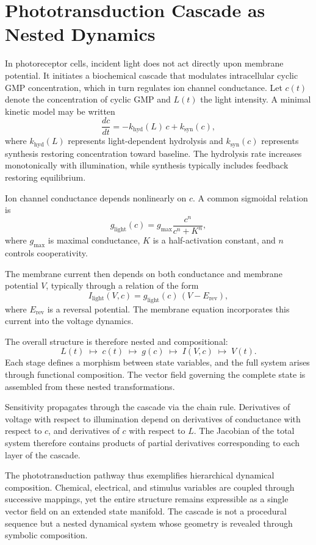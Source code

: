 \documentclass[12pt]{book}
\begin{document}
\section{Phototransduction Cascade as Nested Dynamics}

In photoreceptor cells, incident light does not act directly upon
membrane potential. It initiates a biochemical cascade that modulates
intracellular cyclic GMP concentration, which in turn regulates ion
channel conductance. Let $c(t)$ denote the concentration of cyclic GMP
and $L(t)$ the light intensity. A minimal kinetic model may be written
\[
\frac{dc}{dt}
=
- k_{\mathrm{hyd}}(L)\, c
+
k_{\mathrm{syn}}(c),
\]
where $k_{\mathrm{hyd}}(L)$ represents light-dependent hydrolysis and
$k_{\mathrm{syn}}(c)$ represents synthesis restoring concentration toward
baseline. The hydrolysis rate increases monotonically with illumination,
while synthesis typically includes feedback restoring equilibrium.

Ion channel conductance depends nonlinearly on $c$. A common sigmoidal
relation is
\[
g_{\mathrm{light}}(c)
=
g_{\max}
\frac{c^n}{c^n + K^n},
\]
where $g_{\max}$ is maximal conductance, $K$ is a half-activation
constant, and $n$ controls cooperativity.

The membrane current then depends on both conductance and membrane
potential $V$, typically through a relation of the form
\[
I_{\mathrm{light}}(V,c)
=
g_{\mathrm{light}}(c)\,(V - E_{\mathrm{rev}}),
\]
where $E_{\mathrm{rev}}$ is a reversal potential. The membrane equation
incorporates this current into the voltage dynamics.

The overall structure is therefore nested and compositional:
\[
L(t)
\;\longmapsto\;
c(t)
\;\longmapsto\;
g(c)
\;\longmapsto\;
I(V,c)
\;\longmapsto\;
V(t).
\]
Each stage defines a morphism between state variables, and the full
system arises through functional composition. The vector field governing
the complete state is assembled from these nested transformations.

Sensitivity propagates through the cascade via the chain rule.
Derivatives of voltage with respect to illumination depend on
derivatives of conductance with respect to $c$, and derivatives of
$c$ with respect to $L$. The Jacobian of the total system therefore
contains products of partial derivatives corresponding to each layer
of the cascade.

The phototransduction pathway thus exemplifies hierarchical dynamical
composition. Chemical, electrical, and stimulus variables are coupled
through successive mappings, yet the entire structure remains expressible
as a single vector field on an extended state manifold. The cascade is
not a procedural sequence but a nested dynamical system whose geometry
is revealed through symbolic composition.
\end{document}
